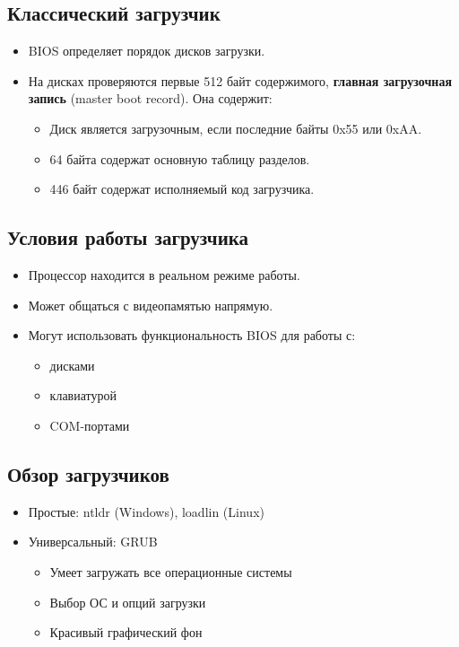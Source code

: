 \subsection{Классический загрузчик}

\begin{itemize}
	\item BIOS определяет порядок дисков загрузки.
	\item На дисках проверяются первые 512 байт содержимого, \textbf{главная загрузочная запись} (master boot record). Она содержит:
		\begin{itemize}
			\item Диск является загрузочным, если последние байты 0x55 или 0xAA.
			\item 64 байта содержат основную таблицу разделов.
			\item 446 байт содержат исполняемый код загрузчика. 
		\end{itemize}
\end{itemize}

\subsection{Условия работы загрузчика}

\begin{itemize}
	\item Процессор находится в реальном режиме работы.
	\item Может общаться с видеопамятью напрямую.
	\item Могут использовать функциональность BIOS для работы с:
		\begin{itemize}
			\item дисками
			\item клавиатурой
			\item COM-портами
		\end{itemize}
\end{itemize}

\subsection{Обзор загрузчиков}

\begin{itemize}
	\item Простые: ntldr (Windows), loadlin (Linux)
	\item Универсальный: GRUB
		\begin{itemize}
			\item Умеет загружать все операционные системы
			\item Выбор ОС и опций загрузки
			\item Красивый графический фон
		\end{itemize}
\end{itemize}

